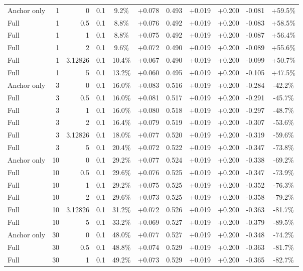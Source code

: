 \begin{table}[htbp]
\begin{tabular}{lrrrccccccc}
Anchor only & 1 & 0 & 0.1 & 9.2\% & +0.078 & 0.493 & +0.019 & +0.200 & -0.081 & +59.5\% \\
Full & 1 & 0.5 & 0.1 & 8.8\% & +0.076 & 0.492 & +0.019 & +0.200 & -0.083 & +58.5\% \\
Full & 1 & 1 & 0.1 & 8.8\% & +0.075 & 0.492 & +0.019 & +0.200 & -0.087 & +56.4\% \\
Full & 1 & 2 & 0.1 & 9.6\% & +0.072 & 0.490 & +0.019 & +0.200 & -0.089 & +55.6\% \\
Full & 1 & 3.12826 & 0.1 & 10.4\% & +0.067 & 0.490 & +0.019 & +0.200 & -0.099 & +50.7\% \\
Full & 1 & 5 & 0.1 & 13.2\% & +0.060 & 0.495 & +0.019 & +0.200 & -0.105 & +47.5\% \\
Anchor only & 3 & 0 & 0.1 & 16.0\% & +0.083 & 0.516 & +0.019 & +0.200 & -0.284 & -42.2\% \\
Full & 3 & 0.5 & 0.1 & 16.0\% & +0.081 & 0.517 & +0.019 & +0.200 & -0.291 & -45.7\% \\
Full & 3 & 1 & 0.1 & 16.0\% & +0.080 & 0.518 & +0.019 & +0.200 & -0.297 & -48.7\% \\
Full & 3 & 2 & 0.1 & 16.4\% & +0.079 & 0.519 & +0.019 & +0.200 & -0.307 & -53.6\% \\
Full & 3 & 3.12826 & 0.1 & 18.0\% & +0.077 & 0.520 & +0.019 & +0.200 & -0.319 & -59.6\% \\
Full & 3 & 5 & 0.1 & 20.4\% & +0.072 & 0.522 & +0.019 & +0.200 & -0.347 & -73.8\% \\
Anchor only & 10 & 0 & 0.1 & 29.2\% & +0.077 & 0.524 & +0.019 & +0.200 & -0.338 & -69.2\% \\
Full & 10 & 0.5 & 0.1 & 29.6\% & +0.076 & 0.525 & +0.019 & +0.200 & -0.347 & -73.9\% \\
Full & 10 & 1 & 0.1 & 29.2\% & +0.075 & 0.525 & +0.019 & +0.200 & -0.352 & -76.3\% \\
Full & 10 & 2 & 0.1 & 29.6\% & +0.073 & 0.525 & +0.019 & +0.200 & -0.358 & -79.2\% \\
Full & 10 & 3.12826 & 0.1 & 31.2\% & +0.072 & 0.526 & +0.019 & +0.200 & -0.363 & -81.7\% \\
Full & 10 & 5 & 0.1 & 33.2\% & +0.069 & 0.527 & +0.019 & +0.200 & -0.379 & -89.5\% \\
Anchor only & 30 & 0 & 0.1 & 48.0\% & +0.077 & 0.527 & +0.019 & +0.200 & -0.348 & -74.2\% \\
Full & 30 & 0.5 & 0.1 & 48.8\% & +0.074 & 0.529 & +0.019 & +0.200 & -0.363 & -81.7\% \\
Full & 30 & 1 & 0.1 & 49.2\% & +0.073 & 0.529 & +0.019 & +0.200 & -0.365 & -82.7\% \\

\end{tabular}
\end{table}
